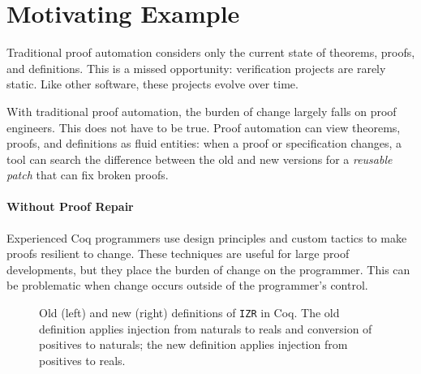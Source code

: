\section{Motivating Example}
\label{sec:patch-motivating}


Traditional proof automation considers only the current state of
theorems, proofs, and definitions. This is a missed opportunity: verification projects 
are rarely static. Like other software, these projects evolve over time.

With traditional proof automation, the burden of change largely falls on proof engineers.
This does not have to be true. Proof automation
can view theorems, proofs, and definitions as fluid entities:
when a proof or specification changes,
a tool can search the difference between the old and new versions
for a \emph{reusable patch} that can fix broken proofs.

\paragraph{Without Proof Repair} Experienced Coq programmers use design principles and custom tactics to make proofs
resilient to change. These techniques are useful for large proof developments, but they
place the burden of change on the programmer. This can be problematic
when change occurs outside of the programmer's control.

\begin{figure*}
\begin{minipage}{0.55\textwidth}
\centering
\lstset{language=coq, aboveskip=0pt, belowskip=0pt}



\end{minipage}
\hfill
\begin{minipage}{0.44\textwidth}
\centering
\lstset{language=coq, aboveskip=0pt, belowskip=0pt}



\end{minipage}
\caption[Caption]{Old (left) and new (right) definitions of \lstinline{IZR} in Coq.
The old definition applies injection from naturals to reals and conversion of positives to
naturals; the new definition applies injection from positives to reals.}
\label{fig:izr}
\end{figure*}

